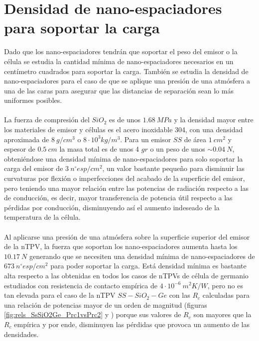 \section{Densidad de nano-espaciadores para soportar la carga}\label{sec:densidad_carga}
Dado que los nano-espaciadores tendrán que soportar el peso del emisor o la célula se estudia la cantidad mínima de nano-espaciadores necesarios en un centímetro cuadrados para soportar la carga. También se estudia la densidad de nano-espaciadores para el caso de que se aplique una presión de una atmósfera a una de las caras para asegurar que las distancias de separación sean lo más uniformes posibles.\\\\
La fuerza de compresión del $SiO_2$ es de unos $1.68 \ MPa$ y la densidad mayor entre los materiales de emisor y células es el acero inoxidable 304, con una densidad aproximada de $8 \ g/cm^3$ o $8\cdot 10^3 kg/m^3$. Para un emisor $SS$ de área $1 \ cm^2$ y espesor de $0.5 \ cm$ la masa total es de unos 4 $gr$ o un peso de unos $\sim 0.04 \ N$, obteniéndose una densidad mínima de nano-espaciadores para solo soportar la carga del emisor de $3 \ n^{\circ}esp/cm^2$, un valor bastante pequeño para disminuir las curvaturas por flexión o imperfecciones del acabado de la superficie del emisor, pero teniendo una mayor relación entre las potencias de radiación respecto a las de conducción, es decir, mayor transferencia de potencia útil respecto a las pérdidas por conducción, disminuyendo así el aumento indeseado de la temperatura de la célula.\\\\
Al aplicarse una presión de una atmósfera sobre la superficie superior del emisor de la nTPV, la fuerza que soportan los nano-espaciadores aumenta hasta los $10.17 \ N$ generando que se necesiten una densidad mínima de nano-espaciadores de $673 \ n^{\circ}esp/cm^2$ para poder soportar la carga. Está densidad mínima es bastante alta respecto a las obtenidas en todos los casos de nTPVs de célula de germanio estudiados con resistencia de contacto empírica de $4\cdot 10^{-6} \ m^2 K/W$, pero no es tan elevada para el caso de la nTPV $SS-SiO_2-Ge$ con las $R_c$ calculadas para una relación de potencias mayor de un orden de magnitud (figuras \ref{fig:rels_SsSiO2Ge_Prc1vsPrc2}  y ) porque sus valores de $R_c$ son mayores que la $R_c$ empírica y por ende, disminuyen las pérdidas que provoca un aumento de las densidades.
\vfill \newpage
